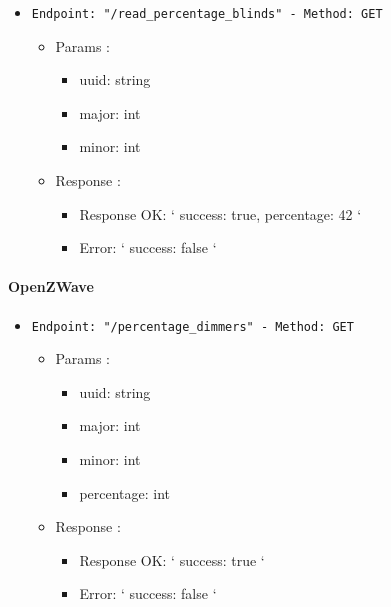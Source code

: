 \begin{itemize}
  \item \texttt{Endpoint: "/read_percentage_blinds" -  Method: GET}
  \begin{itemize} 
    \item Params :
    \begin{itemize}
      \item uuid: string
      \item major: int
      \item minor: int
    \end{itemize}

    \item Response : 
    \begin{itemize}
      \item Response OK: `{ success: true, percentage: 42 }`
      \item Error: `{ success: false }`
    \end{itemize}
  \end{itemize}
\end{itemize}



\paragraph{OpenZWave}

\begin{itemize}
  \item \texttt{Endpoint: "/percentage_dimmers" -  Method: GET}
  \begin{itemize} 
    \item Params :
    \begin{itemize}
      \item uuid: string
      \item major: int
      \item minor: int
      \item percentage: int
    \end{itemize}

    \item Response : 
    \begin{itemize}
      \item Response OK: `{ success: true }`
      \item Error: `{ success: false }`
    \end{itemize}
  \end{itemize}
\end{itemize}

